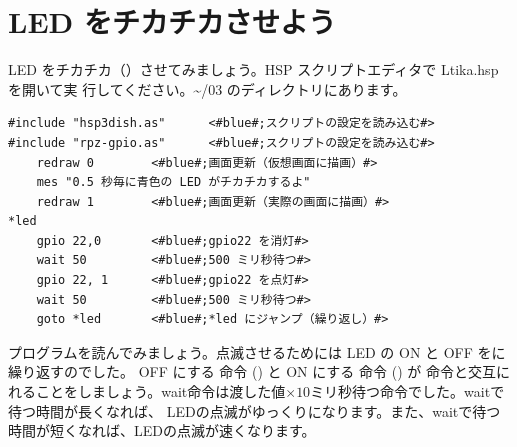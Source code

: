\documentclass[text03.tex]{subfiles}
\begin{document}
\newpage
\section{LED をチカチカさせよう}

LED をチカチカ（）させてみましょう。HSP スクリプトエディタで Ltika.hsp を開いて実
行してください。\textasciitilde /03 のディレクトリにあります。\\

\begin{lstlisting}[caption=\textasciitilde/03/Ltika.hsp,label=Ltika.hsp]
#include "hsp3dish.as"		<#blue#;スクリプトの設定を読み込む#>
#include "rpz-gpio.as"		<#blue#;スクリプトの設定を読み込む#>
	redraw 0		<#blue#;画面更新（仮想画面に描画）#>
	mes "0.5 秒毎に青色の LED がチカチカするよ"
	redraw 1		<#blue#;画面更新（実際の画面に描画）#>
*led
	gpio 22,0		<#blue#;gpio22 を消灯#>
	wait 50 		<#blue#;500 ミリ秒待つ#>
	gpio 22, 1 		<#blue#;gpio22 を点灯#>
	wait 50 		<#blue#;500 ミリ秒待つ#>
	goto *led 		<#blue#;*led にジャンプ（繰り返し）#>
\end{lstlisting}

プログラムを読んでみましょう。点滅させるためには LED の ON と OFF をに繰り返すのでした。
OFF にする  命令 () と ON にする  命令 () が  命令と交互に
れることをしましょう。wait命令は渡した値$\times 10$ミリ秒待つ命令でした。waitで待つ時間が長くなれば、
LEDの点滅がゆっくりになります。また、waitで待つ時間が短くなれば、LEDの点滅が速くなります。

\begin{tcolorbox}[title=\useOmetoi]
	\begin{enumerate}
	\end{enumerate}
\end{tcolorbox}
\end{document}
